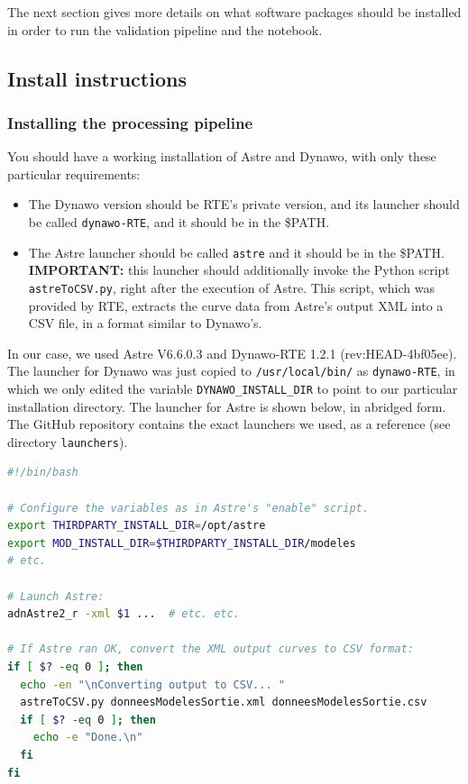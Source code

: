 \documentclass[11pt, a4paper, twoside, titlepage]{article}
\newcommand{\code}[1]{\texttt{#1}}
\begin{document}
The next section gives more details on what software packages should
be installed in order to run the validation pipeline and the notebook.




\subsection{Install instructions}

\subsubsection*{Installing the processing pipeline}

You should have a working installation of Astre and Dynawo, with only
these particular requirements:
\begin{itemize}
\item The Dynawo version should be RTE's private version, and its
  launcher should be called \code{dynawo-RTE}, and it should be in
  the \$PATH.
\item The Astre launcher should be called \code{astre} and it should
  be in the \$PATH. \textbf{IMPORTANT:} this launcher should
  additionally invoke the Python script \code{astreToCSV.py}, right
  after the execution of Astre. This script, which was provided by
  RTE, extracts the curve data from Astre's output XML into a CSV
  file, in a format similar to Dynawo's.
\end{itemize}

In our case, we used Astre V6.6.0.3 and Dynawo-RTE 1.2.1
(rev:HEAD-4bf05ee). The launcher for Dynawo was just copied to
\code{/usr/local/bin/} as \code{dynawo-RTE}, in which we only
edited the variable \code{DYNAWO\_INSTALL\_DIR} to point to our
particular installation directory. The launcher for Astre is shown
below, in abridged form. The GitHub repository contains the exact
launchers we used, as a reference (see directory \code{launchers}).


\begin{lstlisting}[language=bash]
#!/bin/bash

# Configure the variables as in Astre's "enable" script.
export THIRDPARTY_INSTALL_DIR=/opt/astre
export MOD_INSTALL_DIR=$THIRDPARTY_INSTALL_DIR/modeles
# etc.

# Launch Astre:
adnAstre2_r -xml $1 ...  # etc. etc.

# If Astre ran OK, convert the XML output curves to CSV format:
if [ $? -eq 0 ]; then
  echo -en "\nConverting output to CSV... "
  astreToCSV.py donneesModelesSortie.xml donneesModelesSortie.csv
  if [ $? -eq 0 ]; then
    echo -e "Done.\n"
  fi
fi
\end{lstlisting}
\end{document}

